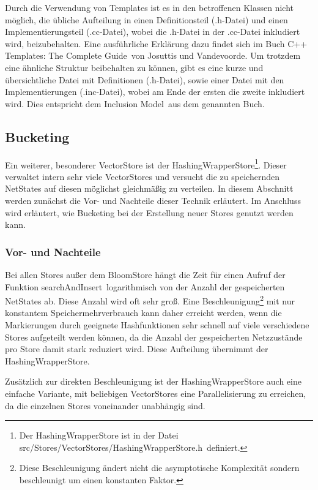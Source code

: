 \documentclass[12pt,a4paper,titlepage]{scrartcl}
\renewcommand \( {\left (}
\renewcommand \) {\right )}
\renewcommand \[ {\left [}
\renewcommand \] {\right ]}
\newcommand \Flqq {\flqq\ }
\begin{document}
Durch die Verwendung von Templates ist es in den betroffenen Klassen nicht möglich, die übliche Aufteilung in einen Definitionsteil (.h-Datei) und einen Implementierungsteil (.cc-Datei), wobei die .h-Datei in der .cc-Datei inkludiert wird, beizubehalten. Eine ausführliche Erklärung dazu findet sich im Buch \frqq C++ Templates: The Complete Guide\Flqq von Josuttis und Vandevoorde. Um trotzdem eine ähnliche Struktur beibehalten zu können, gibt es eine kurze und übersichtliche Datei mit Definitionen (.h-Datei), sowie einer Datei mit den Implementierungen (.inc-Datei), wobei am Ende der ersten die zweite inkludiert wird. Dies entspricht dem \frqq Inclusion Model\Flqq aus dem genannten Buch.

\subsection{Bucketing}
Ein weiterer, besonderer VectorStore ist der \frqq HashingWrapperStore\flqq\footnote{Der HashingWrapperStore ist in der Datei \frqq src/Stores/VectorStores/HashingWrapperStore.h\Flqq definiert.}. Dieser verwaltet intern sehr viele VectorStores und versucht die zu speichernden NetStates auf diesen möglichst gleichmäßig zu verteilen. In diesem Abschnitt werden zunächst die Vor- und Nachteile dieser Technik erläutert. Im Anschluss wird erläutert, wie Bucketing bei der Erstellung neuer Stores genutzt werden kann.

\subsubsection{Vor- und Nachteile}
Bei allen Stores außer dem BloomStore hängt die Zeit für einen Aufruf der Funktion \frqq searchAndInsert\Flqq logarithmisch von der Anzahl der gespeicherten NetStates ab. Diese Anzahl wird oft sehr groß. Eine Beschleunigung\footnote{Diese Beschleunigung ändert nicht die asymptotische Komplexität sondern beschleunigt um einen konstanten Faktor.} mit nur konstantem Speichermehrverbrauch kann daher erreicht werden, wenn die Markierungen durch geeignete Hashfunktionen sehr schnell auf viele verschiedene Stores aufgeteilt werden können, da die Anzahl der gespeicherten Netzzustände pro Store damit stark reduziert wird. Diese Aufteilung übernimmt der HashingWrapperStore.

Zusätzlich zur direkten Beschleunigung ist der HashingWrapperStore auch eine einfache Variante, mit beliebigen VectorStores eine Parallelisierung zu erreichen, da die einzelnen Stores voneinander unabhängig sind.
\end{document}
